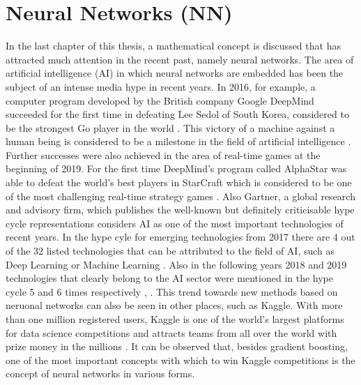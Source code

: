 

\chapter{Neural Networks (NN)}
\label{cha:NN}

In the last chapter of this thesis, a mathematical concept is discussed that has attracted much attention in the recent past, namely neural networks. The area of artificial intelligence (AI) in which neural networks are embedded has been the subject of an intense media hype in recent years. In 2016, for example, a computer program developed by the British company Google DeepMind succeeded for the first time in defeating Lee Sedol of South Korea, considered to be the strongest Go player in the world \cite{wiki_01}. This victory of a machine against a human being is considered to be a milestone in the field of artificial intelligence \cite{LA_Times}. Further successes were also achieved in the area of real-time games at the beginning of 2019. For the first time DeepMind's program called AlphaStar was able to defeat the world's best players in StarCraft which is considered to be one of the most challenging real-time strategy games \cite{AlphaStar}. Also Gartner, a global research and advisory firm, which publishes the well-known but definitely criticisable hype cycle representations considers AI as one of the most important technologies of recent years. In the hype cyle for emerging technologies from 2017 there are 4 out of the 32 listed technologies that can be attributed to the field of AI, such as Deep Learning or Machine Learning \cite{Gartner2017}. Also in the following years 2018 and 2019 technologies that clearly belong to the AI sector were mentioned in the hype cycle 5 and 6 times respectively \cite{Gartner2018}, \cite{Gartner2019}. This trend towards new methods based on neruonal networks can also be seen in other places, such as Kaggle. With more than one million registered users, Kaggle is one of the world's largest platforms for data science competitions and attracts teams from all over the world with prize money in the millions \cite{Kaggle}. It can be observed that, besides gradient boosting, one of the most important concepts with which to win Kaggle competitions is the concept of neural networks in various forms.   

